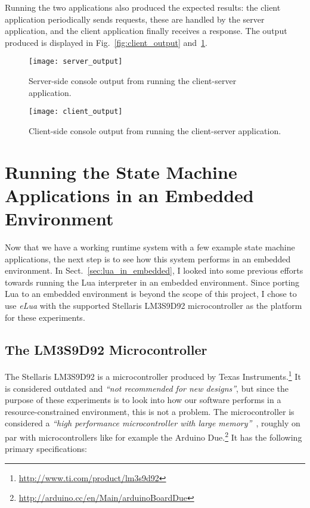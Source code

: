 \noindent
Running the two applications also produced the expected results: the client application periodically sends requests, these are handled by the server application, and the client application finally receives a response. The output produced is displayed in Fig.~\ref{fig:client_output} and~\ref{fig:server_output}.

\begin{figure}[htp]
	\centering
	\begin{minipage}{0.45\linewidth}
		\texttt{[image: server\_output]}
		\caption{Server-side console output from running the client-server application.}
		\label{fig:client_output}
	\end{minipage}
	\quad
	\begin{minipage}{0.45\linewidth}
		\texttt{[image: client\_output]}
		\caption{Client-side console output from running the client-server application.}
		\label{fig:server_output}
	\end{minipage}
\end{figure}

\FloatBarrier
\section{Running the State Machine Applications in an Embedded Environment}
\label{sec:running_on_micro}
Now that we have a working runtime system with a few example state machine applications, the next step is to see how this system performs in an embedded environment. In Sect.~\ref{sec:lua_in_embedded}, I looked into some previous efforts towards running the Lua interpreter in an embedded environment. Since porting Lua to an embedded environment is beyond the scope of this project, I chose to use \emph{eLua} with the supported Stellaris LM3S9D92 microcontroller as the platform for these experiments.

\subsection{The LM3S9D92 Microcontroller}
\label{sec:microcontroller}
The Stellaris LM3S9D92 is a microcontroller produced by Texas Instruments.\footnote{\url{http://www.ti.com/product/lm3s9d92}} It is considered outdated and \emph{``not recommended for new designs''}, but since the purpose of these experiments is to look into how our software performs in a resource-constrained environment, this is not a problem. The microcontroller is considered a \emph{``high performance microcontroller with large memory''}~\cite{website:stellaris_micro}, roughly on par with microcontrollers like for example the Arduino Due.\footnote{\url{http://arduino.cc/en/Main/arduinoBoardDue}} It has the following primary specifications:

